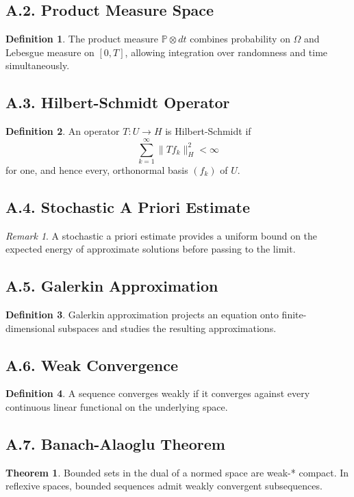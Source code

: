 \documentclass[11pt]{article}
\theoremstyle{definition}
\newtheorem{definition}{Definition}
\newtheorem{theorem}{Theorem}
\theoremstyle{remark}
\newtheorem{remark}{Remark}
\begin{document}
\subsection*{A.2. Product Measure Space}
\begin{definition}
The product measure \(\mathbb P\otimes dt\) combines probability on \(\Omega\) and Lebesgue measure on \([0,T]\), allowing integration over randomness and time simultaneously.
\end{definition}

\subsection*{A.3. Hilbert-Schmidt Operator}
\begin{definition}
An operator \(T:U\to H\) is Hilbert-Schmidt if
\[
\sum_{k=1}^\infty \|Tf_k\|_H^2<\infty
\]
for one, and hence every, orthonormal basis \((f_k)\) of \(U\).
\end{definition}

\subsection*{A.4. Stochastic A Priori Estimate}
\begin{remark}
A stochastic a priori estimate provides a uniform bound on the expected energy of approximate solutions before passing to the limit.
\end{remark}

\subsection*{A.5. Galerkin Approximation}
\begin{definition}
Galerkin approximation projects an equation onto finite-dimensional subspaces and studies the resulting approximations.
\end{definition}

\subsection*{A.6. Weak Convergence}
\begin{definition}
A sequence converges weakly if it converges against every continuous linear functional on the underlying space.
\end{definition}

\subsection*{A.7. Banach-Alaoglu Theorem}
\begin{theorem}
Bounded sets in the dual of a normed space are weak-* compact. In reflexive spaces, bounded sequences admit weakly convergent subsequences.
\end{theorem}
\end{document}

